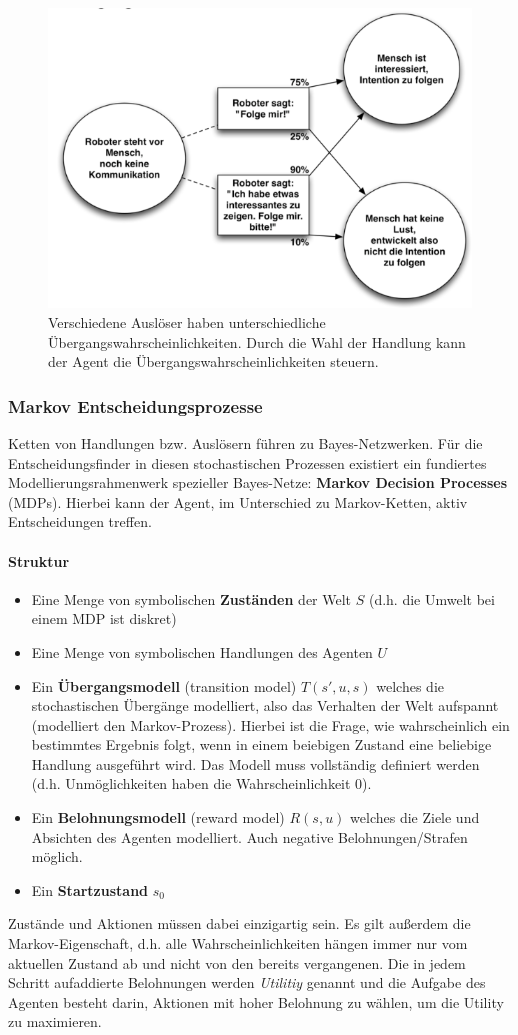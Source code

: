 \begin{figure}[!h]
	\centering
  	\includegraphics[width=0.5\linewidth]{figures/ch07_weltmode-bsp.png}
	\caption{Verschiedene Auslöser haben unterschiedliche Übergangswahrscheinlichkeiten. Durch die Wahl der Handlung kann der Agent die Übergangswahrscheinlichkeiten steuern.}
	\label{fig:ch07:weltmode-bsp}
\end{figure}
\subsubsection{Markov Entscheidungsprozesse}
Ketten von Handlungen bzw. Ausl\"osern f\"uhren zu Bayes-Netzwerken. F\"ur die Entscheidungsfinder in diesen stochastischen Prozessen existiert ein fundiertes Modellierungsrahmenwerk spezieller Bayes-Netze: \textbf{Markov Decision Processes} (MDPs). Hierbei kann der Agent, im Unterschied zu Markov-Ketten, aktiv Entscheidungen treffen.

\paragraph{Struktur}
\begin{itemize}
\item Eine Menge von symbolischen \textbf{Zust\"anden} der Welt $S$ (d.h. die Umwelt bei einem MDP ist diskret)
\item Eine Menge von symbolischen Handlungen des Agenten $U$
\item Ein \textbf{\"Ubergangsmodell} (transition model) $T(s', u, s)$ welches die stochastischen \"Uberg\"ange modelliert, also das Verhalten der Welt aufspannt (modelliert den Markov-Prozess). Hierbei ist die Frage, wie wahrscheinlich ein bestimmtes Ergebnis folgt, wenn in einem beiebigen Zustand eine beliebige Handlung ausgeführt wird. Das Modell muss vollständig definiert werden (d.h.     Unmöglichkeiten haben die Wahrscheinlichkeit 0).
\item Ein \textbf{Belohnungsmodell} (reward model) $R(s,u)$ welches die Ziele und Absichten des Agenten modelliert. Auch negative Belohnungen/Strafen möglich. 
\item Ein \textbf{Startzustand} $s_0$
\end{itemize}
Zust\"ande und Aktionen m\"ussen dabei einzigartig sein.
Es gilt au{\ss}erdem die Markov-Eigenschaft, d.h. alle Wahrscheinlichkeiten h\"angen immer nur vom aktuellen Zustand ab und nicht von den bereits vergangenen.
Die in jedem Schritt aufaddierte Belohnungen werden \emph{Utilitiy} genannt und die Aufgabe des Agenten besteht darin, Aktionen mit hoher Belohnung zu w\"ahlen, um die Utility zu maximieren.

